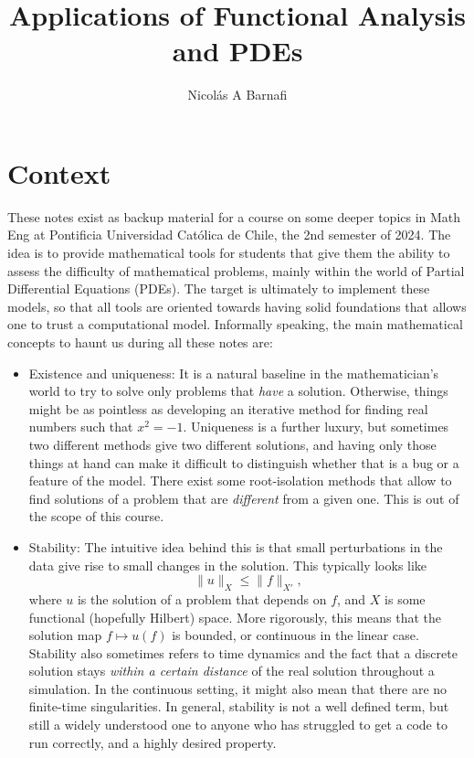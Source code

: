 \documentclass{article}
\title{Applications of Functional Analysis and PDEs}
\author{Nicol\'as A Barnafi}
\begin{document}
\maketitle
\newpage
\tableofcontents
\newpage

\section*{Context}

These notes exist as backup material for a course on some deeper topics in Math Eng at Pontificia Universidad Católica de Chile, the 2nd semester of 2024. The idea is to provide mathematical tools for students that give them the ability to assess the difficulty of mathematical problems, mainly within the world of Partial Differential Equations (PDEs). The target is ultimately to implement these models, so that all tools are oriented towards having solid foundations that allows one to trust a computational model. Informally speaking, the main mathematical concepts to haunt us during all these notes are: 
    \begin{itemize}
        \item Existence and uniqueness: It is a natural baseline in the mathematician's world to try to solve only problems that \emph{have} a solution. Otherwise, things might be as pointless as developing an iterative method for finding real numbers such that $x^2 = -1$. Uniqueness is a further luxury, but sometimes two different methods give two different solutions, and having only those things at hand can make it difficult to distinguish whether that is a bug or a feature of the model. There exist some root-isolation methods that allow to find solutions of a problem that are \emph{different} from a given one. This is out of the scope of this course. 
        \item Stability: The intuitive idea behind this is that small perturbations in the data give rise to small changes in the solution. This typically looks like 
            $$ \| u\|_X \leq \| f\|_{X'}, $$
        where $u$ is the solution of a problem that depends on $f$, and $X$ is some functional (hopefully Hilbert) space. More rigorously, this means that the solution map $f \mapsto u(f)$ is bounded, or continuous in the linear case. Stability also sometimes refers to time dynamics and the fact that a discrete solution stays \emph{within a certain distance} of the real solution throughout a simulation. In the continuous setting, it might also mean that there are no finite-time singularities. In general, stability is not a well defined term, but still a widely understood one to anyone who has struggled to get a code to run correctly, and a highly desired property. 
    \end{itemize}
\end{document}
